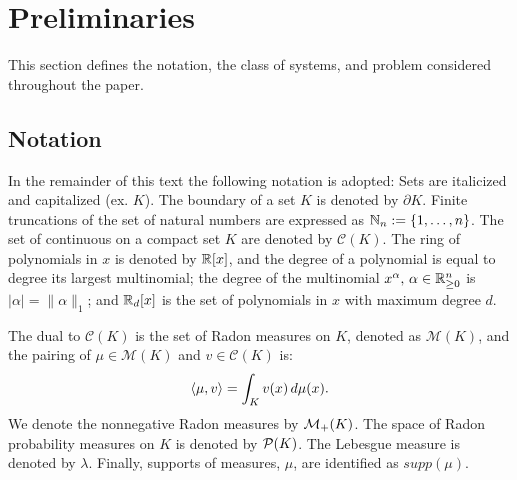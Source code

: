   \section{Preliminaries}
\label{sec:preliminaries}
  This section defines the notation, the class of systems, and problem considered throughout the paper.

  \subsection{Notation}
  In the remainder of this text the following notation is adopted:
Sets are italicized and capitalized (ex. $K$).
The boundary of a set $K$ is denoted by $\partial K$.
Finite truncations of the set of natural numbers are expressed as \mbox{$\mathbb{N}_n:=\{1,\ldots,n\}$}.
The set of continuous on a compact set $K$ are denoted by $\mathcal C(K)$.
The ring of polynomials in $x$ is denoted by $\mathbb{R}[x]$, and the degree of a polynomial is equal to degree its largest multinomial; the degree of the multinomial $x^\alpha,\,\alpha\in \mathbb{R}_{\ge 0}^n$ is $|\alpha|=\|\alpha\|_1$; and $\mathbb{R}_d[x]$ is the set of polynomials in $x$ with maximum degree $d$.

The dual to $\mathcal C(K)$ is the set of Radon measures on $K$, denoted as $\mathcal M(K)$, and the pairing of $\mu\in \mathcal M(K)$ and $v\in \mathcal C(K)$ is:
  \begin{align}
  \left\langle \mu,v\right\rangle=\int_{K}v(x)\,d\mu(x).
  \end{align}
We denote the nonnegative Radon measures by ${\cal M}_+(K)$.
The space of Radon probability measures on $K$ is denoted by ${\cal P}(K)$.
The Lebesgue measure is denoted by $\lambda$.
Finally, supports of measures, $\mu$, are identified as $supp(\mu)$.

